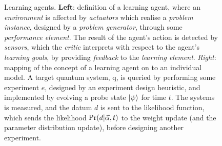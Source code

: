 \begin{figure}
\begin{minipage}[c]{0.4\textwidth}
    \end{minipage}


    \caption[Learning agents]{
        Learning agents. \textbf{Left}: definition of a learning agent, where an \emph{environment} is affected by 
        \emph{actuators} which realise a \emph{problem instance}, designed by a \emph{problem generator}, through some \emph{performance element}. 
        The result of the agent's action is detected by \emph{sensors}, which the \emph{critic} interprets with respect to
        the agent's \emph{learning goals}, by providing \emph{feedback} to the \emph{learning element}. 
        \emph{Right}: mapping of the concept of a learning agent on to an individual model. 
        A target quantum system, \gls{q}, is queried by performing some experiment $e$, 
        designed by an experiment design heuristic, and implemented by evolving a probe state $\ket{\psi}$ for time $t$. 
        The systems is measured, and the datum $d$ is sent to the \gls{likelihood} function, which sends the likelihood $\Pr(d|\vec{\alpha}, t)$
        to the weight update (and the parameter distribution update), before designing another experiment. 
    }
    \label{fig:learning_agent}
\end{figure}

   